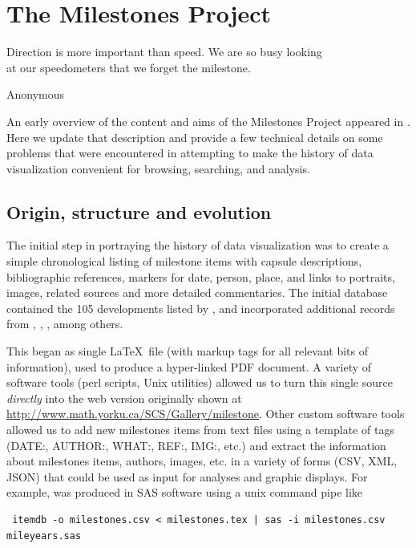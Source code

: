 \section{The Milestones Project}\label{sec:project}
\epigraph{Direction is more important than speed. We are so busy looking \\ at our speedometers that we forget the milestone.}{Anonymous} %

An early overview of the content and aims of the Milestones Project appeared in \cite{Friendly:04:gfkl}. Here we update that description and provide a few technical details on some problems that were encountered in attempting to make the history of data visualization convenient for browsing, searching, and analysis.

\subsection{Origin, structure and evolution}\label{sec:structure}
The initial step in portraying the history of data visualization was to create a simple chronological listing of milestone items with capsule descriptions, bibliographic references, markers for date, person, place, and links to portraits, images, related sources and more detailed commentaries. The initial database contained the 105 developments listed by \citet{BenigerRobyn:1978}, and incorporated additional records from \citet{Hankins:1999}, \citet{Tufte:1983,Tufte:1990,Tufte:1997}, \citet{Heiser:2000}, among others.

This began as single \LaTeX\ file (with markup tags for all relevant bits of information), used to produce a hyper-linked PDF document.  A variety of software tools (perl scripts, Unix utilities) allowed us to turn this single source \emph{directly} into the web version originally shown at
\url{http://www.math.yorku.ca/SCS/Gallery/milestone}.  Other custom software tools allowed us to add new milestones items from text files using a template of tags (DATE:, AUTHOR:, WHAT:, REF:, IMG:, etc.) and extract the information about milestones items, authors, images, etc. in a variety of forms (CSV, XML, JSON) that could be used as input for analyses and graphic displays.  For example,  was produced in SAS software using a unix command pipe like \begin{verbatim} itemdb -o milestones.csv < milestones.tex | sas -i milestones.csv mileyears.sas \end{verbatim}

